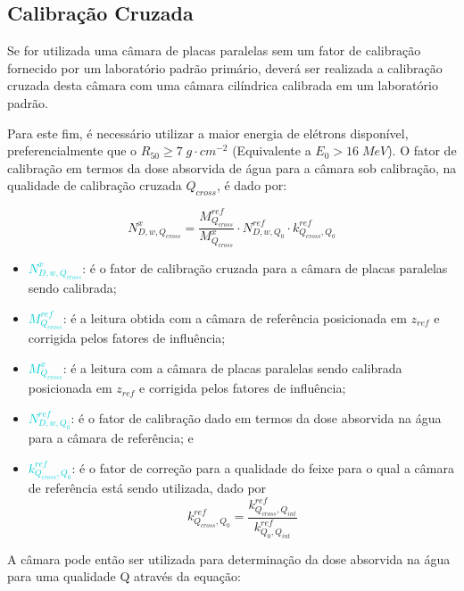 \documentclass[11pt,a4paper]{article}
\newcounter{exemplo}
\begin{document}
	\subsection*{Calibração Cruzada}
	
	Se for utilizada uma câmara de placas paralelas sem um fator de calibração fornecido por um laboratório padrão primário, deverá ser realizada a calibração cruzada desta câmara com uma câmara cilíndrica calibrada em um laboratório padrão.

	Para este fim, é necessário utilizar a maior energia de elétrons disponível, preferencialmente que o  $R_{50} \geq 7\; g\cdot cm^{-2}$ (Equivalente a $E_0 > 16 \; MeV$). O fator de calibração em termos da dose absorvida de água para a câmara sob calibração, na qualidade de calibração cruzada $Q_{cross}$, é dado por:

	$$N_{D,w,Q_{cross}}^{x} = \frac{M_{Q_{cross}}^{ref}}{M_{Q_{cross}}^{x}} \cdot N_{D,w,Q_0}^{ref}\cdot k_{Q_{cross},Q_0}^{ref}$$

	\begin{exemplo}[onde:]
		\begin{itemize}[label=\textcolor{CarnationPink}{$\star$}]
			\item \textcolor{DarkTurquoise}{$N_{D,w,Q_{cross}}^{x}$}: é o fator de calibração cruzada para a câmara de placas paralelas sendo calibrada;
			\item \textcolor{DarkTurquoise}{$M_{Q_{cross}}^{ref}$}: é a leitura obtida com a câmara de referência posicionada em $z_{ref}$ e corrigida pelos fatores de influência;
			\item \textcolor{DarkTurquoise}{$M_{Q_{cross}}^{x}$}: é a leitura com a câmara de placas paralelas sendo calibrada posicionada em $z_{ref}$ e corrigida pelos fatores de influência;
			\item \textcolor{DarkTurquoise}{$N_{D,w,Q_0}^{ref}$}: é o fator de calibração dado em termos da dose absorvida na água para a câmara de referência; e
			\item \textcolor{DarkTurquoise}{$ k_{Q_{cross},Q_0}^{ref}$}: é o fator de correção para a qualidade do feixe para o qual a câmara de referência está sendo utilizada, dado por $$k_{Q_{cross},Q_0}^{ref} = \frac{k_{Q_{cross},Q_{int}}^{ref}}{k_{Q_0, Q_{int}}^{ref}}$$
		\end{itemize}
	\end{exemplo}

	A câmara pode então ser utilizada para determinação da dose absorvida na água para uma qualidade Q através da equação:
\end{document}
